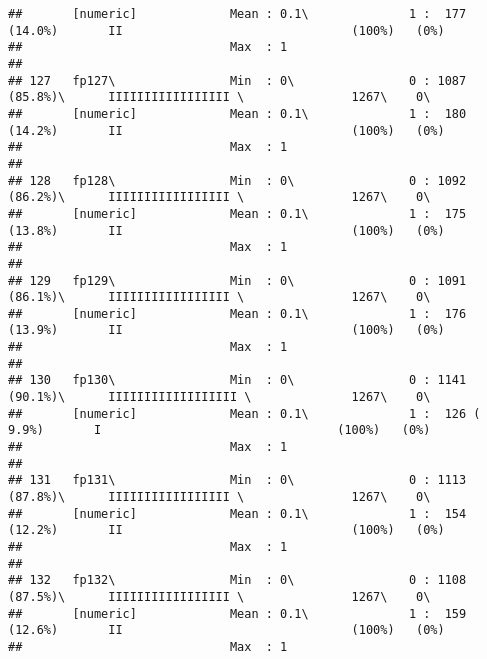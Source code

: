 \documentclass[]{article}
\begin{document}
\begin{verbatim}
##       [numeric]             Mean : 0.1\              1 :  177 (14.0%)       II                                (100%)   (0%)     
##                             Max  : 1                                                                                            
## 
## 127   fp127\                Min  : 0\                0 : 1087 (85.8%)\      IIIIIIIIIIIIIIIII \               1267\    0\       
##       [numeric]             Mean : 0.1\              1 :  180 (14.2%)       II                                (100%)   (0%)     
##                             Max  : 1                                                                                            
## 
## 128   fp128\                Min  : 0\                0 : 1092 (86.2%)\      IIIIIIIIIIIIIIIII \               1267\    0\       
##       [numeric]             Mean : 0.1\              1 :  175 (13.8%)       II                                (100%)   (0%)     
##                             Max  : 1                                                                                            
## 
## 129   fp129\                Min  : 0\                0 : 1091 (86.1%)\      IIIIIIIIIIIIIIIII \               1267\    0\       
##       [numeric]             Mean : 0.1\              1 :  176 (13.9%)       II                                (100%)   (0%)     
##                             Max  : 1                                                                                            
## 
## 130   fp130\                Min  : 0\                0 : 1141 (90.1%)\      IIIIIIIIIIIIIIIIII \              1267\    0\       
##       [numeric]             Mean : 0.1\              1 :  126 ( 9.9%)       I                                 (100%)   (0%)     
##                             Max  : 1                                                                                            
## 
## 131   fp131\                Min  : 0\                0 : 1113 (87.8%)\      IIIIIIIIIIIIIIIII \               1267\    0\       
##       [numeric]             Mean : 0.1\              1 :  154 (12.2%)       II                                (100%)   (0%)     
##                             Max  : 1                                                                                            
## 
## 132   fp132\                Min  : 0\                0 : 1108 (87.5%)\      IIIIIIIIIIIIIIIII \               1267\    0\       
##       [numeric]             Mean : 0.1\              1 :  159 (12.6%)       II                                (100%)   (0%)     
##                             Max  : 1                                                                                            

\end{verbatim}
\end{document}
